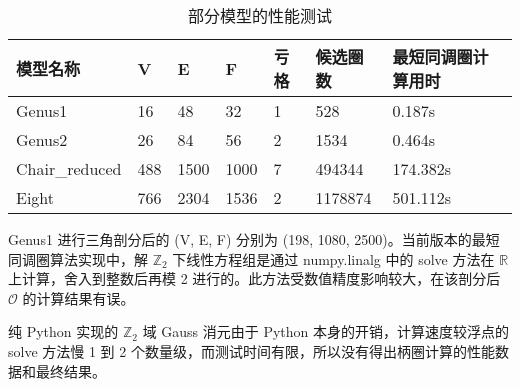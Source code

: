 \begin{table}[h!]
    \centering
    \caption{部分模型的性能测试}
    \label{tab:perftable}
    \begin{tabular}{lllllll}
      \toprule
      模型名称 & V   & E    & F  & 亏格  & 候选圈数 & 最短同调圈计算用时 \\
      \midrule
      Genus1        & 16  & 48   & 32   & 1 & 528 & 0.187s \\
      Genus2        & 26  & 84   & 56   & 2 & 1534 & 0.464s \\
      Chair\_reduced & 488 & 1500 & 1000 & 7 & 494344 & 174.382s \\
      Eight         & 766 & 2304 & 1536 & 2 & 1178874 & 501.112s \\
      \bottomrule
    \end{tabular}
\end{table}

Genus1 进行三角剖分后的 (V, E, F) 分别为 (198, 1080, 2500)。当前版本的最短同调圈算法实现中，解 $ \mathbb{Z}_2 $ 下线性方程组是通过 numpy.linalg 中的 solve 方法在 $ \mathbb{R} $ 上计算，舍入到整数后再模 2 进行的。此方法受数值精度影响较大，在该剖分后 $ \mathcal{O} $ 的计算结果有误。

纯 Python 实现的 $ \mathbb{Z}_2 $ 域 Gauss 消元由于 Python 本身的开销，计算速度较浮点的 solve 方法慢 1 到 2 个数量级，而测试时间有限，所以没有得出柄圈计算的性能数据和最终结果。